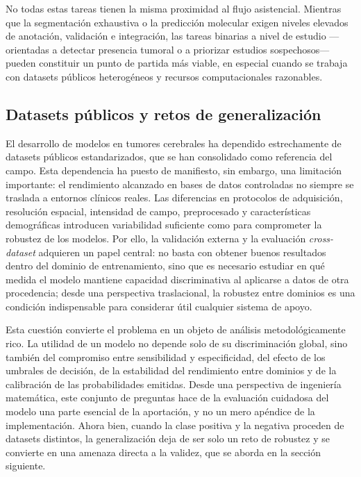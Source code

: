 No todas estas tareas tienen la misma proximidad al flujo asistencial. Mientras
que la segmentación exhaustiva o la predicción molecular exigen niveles elevados
de anotación, validación e integración, las tareas binarias a nivel de estudio
---orientadas a detectar presencia tumoral o a priorizar estudios sospechosos---
pueden constituir un punto de partida más viable, en especial cuando se trabaja
con datasets públicos heterogéneos y recursos computacionales razonables.

\subsection{Datasets públicos y retos de generalización}

El desarrollo de modelos en tumores cerebrales ha dependido estrechamente de
datasets públicos estandarizados, que se han consolidado como referencia del
campo. Esta dependencia ha puesto de manifiesto, sin embargo, una limitación
importante: el rendimiento alcanzado en bases de datos controladas no siempre se
traslada a entornos clínicos reales. Las diferencias en protocolos de
adquisición, resolución espacial, intensidad de campo, preprocesado y
características demográficas introducen variabilidad suficiente como para
comprometer la robustez de los modelos. Por ello, la validación externa y la
evaluación \emph{cross-dataset} adquieren un papel central: no basta con obtener
buenos resultados dentro del dominio de entrenamiento, sino que es necesario
estudiar en qué medida el modelo mantiene capacidad discriminativa al aplicarse a
datos de otra procedencia; desde una perspectiva traslacional, la robustez entre
dominios es una condición indispensable para considerar útil cualquier sistema de
apoyo.

Esta cuestión convierte el problema en un objeto de análisis metodológicamente
rico. La utilidad de un modelo no depende solo de su discriminación global, sino
también del compromiso entre sensibilidad y especificidad, del efecto de los
umbrales de decisión, de la estabilidad del rendimiento entre dominios y de la
calibración de las probabilidades emitidas. Desde una perspectiva de ingeniería
matemática, este conjunto de preguntas hace de la evaluación cuidadosa del modelo
una parte esencial de la aportación, y no un mero apéndice de la implementación.
Ahora bien, cuando la clase positiva y la negativa proceden de datasets distintos,
la generalización deja de ser solo un reto de robustez y se convierte en una
amenaza directa a la validez, que se aborda en la sección siguiente.

